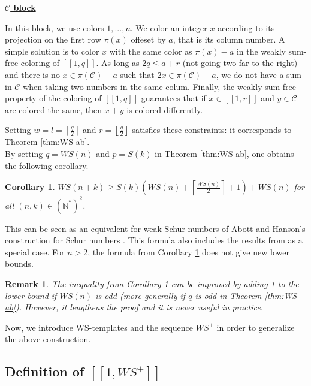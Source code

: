 \documentclass{article}
\newtheorem{computational theorem}[definition]{Computational Theorem}
\newtheorem{corollary}[definition]{Corollary}
\newtheorem{remark}[definition]{Remark}
\newcommand{\WS}{\mathit{WS}}
\begin{document}
\noindent \underline{\textbf{\(\mathcal{C}\) block}}
\par
In this block, we use colors \(1, ..., n\). We color an integer \(x\) according to its projection on the first row \(\pi(x)\) offeset by \(a\), 
that is its column number. A simple solution is to color \(x\) with the same color as \(\pi(x) - a\) in the weakly sum-free coloring of 
\([\![1,q]\!]\). As long as \(2q \leqslant a + r\) (not going two far to the right) and there is no \(x \in \pi(\mathcal{C}) - a\) such that 
\(2x \in \pi(\mathcal{C}) - a\), we do not have a sum in \(\mathcal{C}\) when taking two numbers in the same colum. Finally, the 
weakly sum-free property of the coloring of \([\![1,q]\!]\) guarantees that if \(x \in [\![1,r]\!]\) and \(y \in \mathcal{C}\) are colored 
the same, then \(x + y\) is colored differently.

Setting \(w = l = \left\lceil \displaystyle \frac{q}{2} \right\rceil\) and \(r = \left\lfloor \displaystyle \frac{q}{2} \right\rfloor\) satisfies these 
constraints: it corresponds to Theorem \ref{thm:WS-ab}. \\

By setting \(q = \WS (n)\) and \(p = S(k)\) in Theorem \ref{thm:WS-ab}, one obtains the following corollary.

\begin{corollary}
\label{cor:ineqWS-S}
\(\WS (n+k) \geqslant S(k) \left (\WS (n) + \left \lceil \displaystyle \frac{\WS (n)}{2} \right \rceil +1 \right) + \WS (n)\)
for all \((n,k) \in (\mathbb{N}^*)^2\).
\end{corollary}

This can be seen as an equivalent for weak Schur numbers of Abott and Hanson's construction for Schur numbers 
\cite{AbbottHanson}. This formula also includes the results from \cite{RowleyWS} as a special case. For \(n>2\), 
the formula from Corollary \ref{cor:ineqWS-S} does not give new lower bounds.

\begin{remark}
The inequality from Corollary \ref{cor:ineqWS-S} can be improved by adding 1 to the lower bound if \(\WS (n)\) is odd (more generally if \(q\) is
odd in Theorem \ref{thm:WS-ab}). However, it lengthens the proof and it is never useful in practice.
\end{remark}
\par
Now, we introduce WS-templates and the sequence \(\WS^+\) in order to generalize the above construction.

\subsection{Definition of \([\![ 1, \WS^+ ]\!]\)}
\label{DefinitionWS+}
\end{document}
